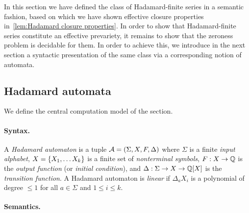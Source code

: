In this section we have defined the class of Hadamard-finite series in a semantic fashion,
based on which we have shown effective closure properties in~\cref{lem:Hadamard closure properties}.
%
In order to show that Hadamard-finite series constitute an effective prevariety,
it remains to show that the zeroness problem is decidable for them.
%
In order to achieve this, we introduce in the next section a syntactic presentation of the same class
via a corresponding notion of automata.

\subsection{Hadamard automata}
\label{sec:Hadamard automata}

We define the central computation model of the section.

\paragraph{Syntax.}

A \emph{Hadamard automaton} is a tuple $\mathcal A = (\Sigma, X, F, \Delta)$
where $\Sigma$ is a finite \emph{input alphabet},
$X = \left\{X_1,  \dots X_k\right\}$ is a finite set of \emph{nonterminal symbols},
$F : X \to \mathbb Q$ is the \emph{output function} (or \emph{initial condition}),
and $\Delta : \Sigma \to X \to \mathbb Q[X]$ is the \emph{transition function}.
%
A Hadamard automaton is \emph{linear} if $\Delta_a X_i$ is a polynomial of degree $\leq 1$
for all $a \in \Sigma$ and $1 \leq i \leq k$.

\paragraph{Semantics.}

